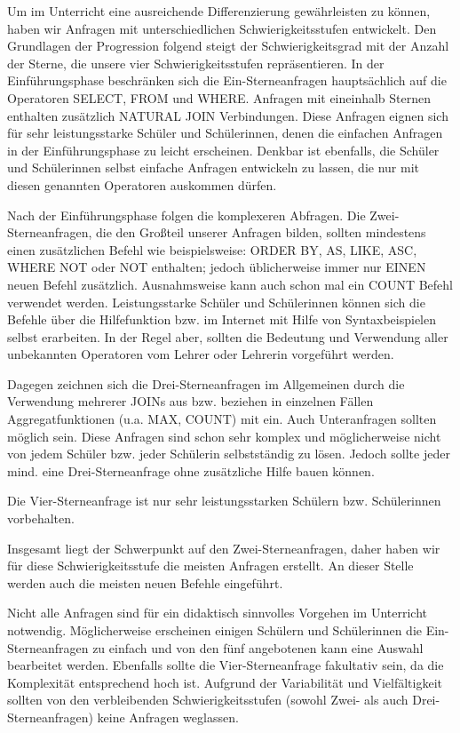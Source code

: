 \documentclass[fleqn]{scrartcl}
\begin{document}
Um im Unterricht eine ausreichende Differenzierung gewährleisten zu können, haben wir Anfragen mit unterschiedlichen Schwierigkeitsstufen entwickelt. Den Grundlagen der Progression folgend steigt der Schwierigkeitsgrad mit der Anzahl der Sterne, die unsere vier Schwierigkeitsstufen repräsentieren.
In der Einführungsphase beschränken sich die Ein-Sterneanfragen hauptsächlich auf die Operatoren SELECT, FROM und WHERE. Anfragen mit eineinhalb Sternen enthalten zusätzlich NATURAL JOIN Verbindungen. Diese Anfragen eignen sich für sehr leistungsstarke Schüler und Schülerinnen, denen die einfachen Anfragen in der Einführungsphase zu leicht erscheinen. Denkbar ist ebenfalls, die Schüler und Schülerinnen selbst einfache Anfragen entwickeln zu lassen, die nur mit diesen genannten Operatoren auskommen dürfen.

Nach der Einführungsphase folgen die komplexeren Abfragen. Die Zwei-Sterneanfragen, die den Großteil unserer Anfragen bilden,  sollten mindestens einen zusätzlichen Befehl wie beispielsweise: ORDER BY, AS, LIKE, ASC, WHERE NOT oder NOT enthalten; jedoch üblicherweise immer nur EINEN neuen Befehl zusätzlich. Ausnahmsweise kann auch schon mal ein COUNT Befehl verwendet werden.  Leistungsstarke Schüler und Schülerinnen können sich die Befehle über die Hilfefunktion bzw. im Internet mit Hilfe von Syntaxbeispielen selbst erarbeiten. In der Regel aber, sollten die Bedeutung und Verwendung aller unbekannten Operatoren vom Lehrer oder Lehrerin vorgeführt werden.

Dagegen zeichnen sich die Drei-Sterneanfragen im Allgemeinen durch die Verwendung mehrerer JOINs aus bzw. beziehen in einzelnen Fällen Aggregatfunktionen (u.a. MAX, COUNT) mit ein. Auch Unteranfragen sollten möglich sein. Diese Anfragen sind schon sehr komplex und möglicherweise nicht von jedem Schüler bzw. jeder Schülerin selbstständig zu lösen. Jedoch sollte jeder mind. eine Drei-Sterneanfrage ohne zusätzliche Hilfe bauen können.

Die Vier-Sterneanfrage ist nur sehr leistungsstarken Schülern bzw. Schülerinnen vorbehalten.

Insgesamt liegt der Schwerpunkt auf den Zwei-Sterneanfragen, daher haben wir für diese Schwierigkeitsstufe die meisten Anfragen erstellt. An dieser Stelle werden auch die meisten neuen Befehle eingeführt.

Nicht alle Anfragen sind für ein didaktisch sinnvolles Vorgehen im Unterricht notwendig. Möglicherweise erscheinen einigen Schülern und Schülerinnen die Ein-Sterneanfragen zu einfach und von den fünf angebotenen kann eine Auswahl bearbeitet werden. Ebenfalls sollte die Vier-Sterneanfrage fakultativ sein, da die Komplexität entsprechend hoch ist. Aufgrund der Variabilität und Vielfältigkeit sollten von den verbleibenden Schwierigkeitsstufen (sowohl Zwei- als auch Drei-Sterneanfragen) keine Anfragen weglassen. 
\end{document}
